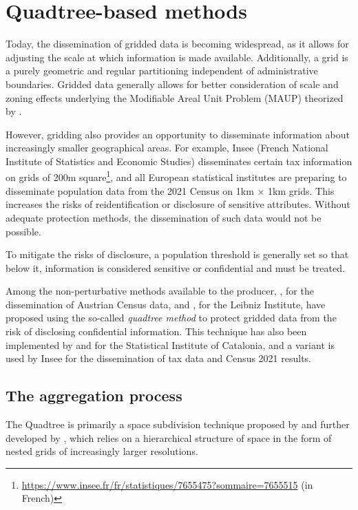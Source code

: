 \section{Quadtree-based methods}\label{sec:quadtree}

Today, the dissemination of gridded data is becoming widespread, as it allows for adjusting the scale at which information is made available. Additionally, a grid is a purely geometric and regular partitioning independent of administrative boundaries. Gridded data generally allows for better consideration of scale and zoning effects underlying the Modifiable Areal Unit Problem (MAUP) theorized by \cite{openshaw1979million}.

However, gridding also provides an opportunity to disseminate information about increasingly smaller geographical areas. For example, Insee (French National Institute of Statistics and Economic Studies) disseminates certain tax information on grids of 200m square\footnote{\url{https://www.insee.fr/fr/statistiques/7655475?sommaire=7655515} (in French)}, and all European statistical institutes are preparing to disseminate population data from the 2021 Census on 1km $\times$ 1km grids. This increases the risks of reidentification or disclosure of sensitive attributes. Without adequate protection methods, the dissemination of such data would not be possible.

To mitigate the risks of disclosure, a population threshold is generally set so that below it, information is considered sensitive or confidential and must be treated.

Among the non-perturbative methods available to the producer, \citet{Strobl_2005}, for the dissemination of Austrian Census data, and \citet{Behnisch_Meinel_Tramsen_Diesselmann_2013}, for the Leibniz Institute, have proposed using the so-called \emph{quadtree method} to protect gridded data from the risk of disclosing confidential information. This technique has also been implemented by \citet{Lagonigro_Oller_Martori_2017} and \citet{Suñé_Ibáñez_2017} for the Statistical Institute of Catalonia, and a variant is used by Insee \citep{Branchu_Costemalle_Fontaine_2018} for the dissemination of tax data and Census 2021 results.


\subsection{The aggregation process}

The Quadtree is primarily a space subdivision technique proposed by \cite{hunter1978efficient} and further developed by \cite{Samet_1984}, which relies on a hierarchical structure of space in the form of nested grids of increasingly larger resolutions.

